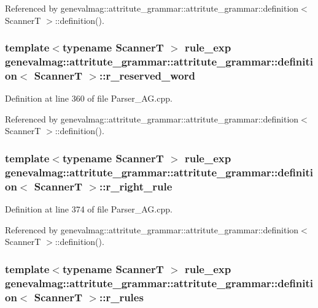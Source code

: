 Referenced by genevalmag::attritute\_\-grammar::attritute\_\-grammar::definition$<$ ScannerT $>$::definition().\hypertarget{structgenevalmag_1_1attritute__grammar_1_1definition_db34864ec30ef01193708655b8370496}{
\subsubsection[{r\_\-reserved\_\-word}]{\setlength{\rightskip}{0pt plus 5cm}template$<$typename ScannerT $>$ {\bf rule\_\-exp} genevalmag::attritute\_\-grammar::attritute\_\-grammar::definition$<$ ScannerT $>$::{\bf r\_\-reserved\_\-word}}}
\label{structgenevalmag_1_1attritute__grammar_1_1definition_db34864ec30ef01193708655b8370496}




Definition at line 360 of file Parser\_\-AG.cpp.

Referenced by genevalmag::attritute\_\-grammar::attritute\_\-grammar::definition$<$ ScannerT $>$::definition().\hypertarget{structgenevalmag_1_1attritute__grammar_1_1definition_05ff964cd54e5a33f9b7fe74fff536ae}{
\subsubsection[{r\_\-right\_\-rule}]{\setlength{\rightskip}{0pt plus 5cm}template$<$typename ScannerT $>$ {\bf rule\_\-exp} genevalmag::attritute\_\-grammar::attritute\_\-grammar::definition$<$ ScannerT $>$::{\bf r\_\-right\_\-rule}}}
\label{structgenevalmag_1_1attritute__grammar_1_1definition_05ff964cd54e5a33f9b7fe74fff536ae}




Definition at line 374 of file Parser\_\-AG.cpp.

Referenced by genevalmag::attritute\_\-grammar::attritute\_\-grammar::definition$<$ ScannerT $>$::definition().\hypertarget{structgenevalmag_1_1attritute__grammar_1_1definition_dc5a5f4c199ceb07dea1fe7f818cfebd}{
\subsubsection[{r\_\-rules}]{\setlength{\rightskip}{0pt plus 5cm}template$<$typename ScannerT $>$ {\bf rule\_\-exp} genevalmag::attritute\_\-grammar::attritute\_\-grammar::definition$<$ ScannerT $>$::{\bf r\_\-rules}}}
\label{structgenevalmag_1_1attritute__grammar_1_1definition_dc5a5f4c199ceb07dea1fe7f818cfebd}




